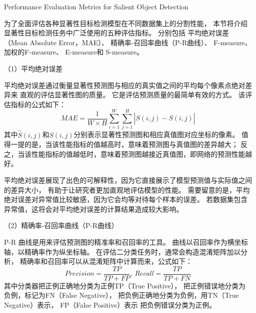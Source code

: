 



{Performance Evaluation Metrics for Salient Object Detection}



为了全面评估各种显著性目标检测模型在不同数据集上的分割性能，
本节将介绍显著性目标检测任务中广泛使用的五种评估指标。
分别包括
平均绝对误差（Mean Absolute Error，MAE）、
精确率-召回率曲线（P-R曲线）、
F-measure、
加权的F-measure、
E-measure和
S-measure。








（1）平均绝对误差\par
平均绝对误差通过衡量显著性预测图与相应的真实值之间的平均每个像素点绝对差异来
直观的评估显著性图的质量。
它是评估预测质量的最简单有效的方式。
该评估指标的公式如下：
\begin{equation}
	MAE=\frac{1}{W \times H}\sum_{i=1}^{W} \sum_{j=1}^{H} \left |  \hat{S} (i,j) - S(i,j)\right | 
\end{equation}
%
%
其中$\hat{S}(i,j)$和$S(i,j)$分别表示显著性预测图和相应真值图对应坐标的像素。
值得一提的是，当该性能指标的值越高时，意味着预测图与真值图的差异越大；
反之，当该性能指标的值越低时，意味着预测图越接近真值图，即网络的预测性能越好。




平均绝对误差展现了出色的可解释性，因为它直接展示了模型预测值与实际值之间的差异大小，
有助于让研究者更加直观地评估模型的性能。
需要留意的是，平均绝对误差对异常值比较敏感，因为它会均等对待每个样本的误差。
若数据集包含异常值，这将会对平均绝对误差的计算结果造成较大影响。







（2）精确率-召回率曲线（P-R曲线）\par
%
%
P-R 曲线是用来评估预测图的精准率和召回率的工具。
曲线以召回率作为横坐标轴，以精确率作为纵坐标轴。
在评估二分类任务时，通常会构造混淆矩阵加以分析，
精确率和召回率可以从混淆矩阵中计算而来，公式如下：
%
%
\begin{equation}
	Precision = \frac{TP}{TP + FP},~Recall = \frac{TP}{TP+FN}
\end{equation}
%
%
其中分类器把正例正确地分类为正例TP（True Positive），
把正例错误地分类为负例，标记为FN（False Negative），
把负例正确地分类为负例，用TN（True Negative）表示，
FP（False Positive）表示
把负例错误分类为正例。


